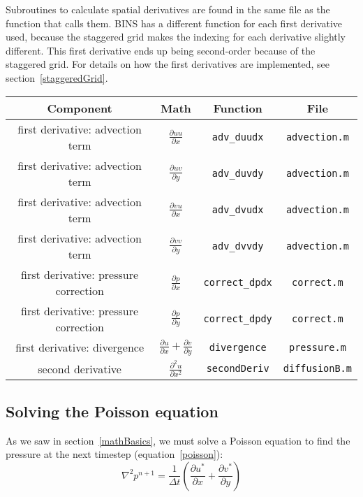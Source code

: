 \documentclass[12pt]{article}
\begin{document}
Subroutines to calculate spatial derivatives are found in the same file as the function that calls them.  BINS has a different function for each first derivative used, because the staggered grid makes the indexing for each derivative slightly different.  This first derivative ends up being second-order because of the staggered grid. For details on how the first derivatives are implemented, see section~\ref{staggeredGrid}.

\begin{center}
\begin{tabular}{|c|c|c|c|}
\hline 
\bf{Component} & \bf{Math} & \bf{Function} & \bf{File}\\ 
\hline 
first derivative: advection term & \Large{$\frac{\partial uu}{\partial x}$} & \texttt{adv\_duudx} & \texttt{advection.m}\\ 
\hline 
first derivative: advection term & \Large{$\frac{\partial uv}{\partial y}$} & \texttt{adv\_duvdy} & \texttt{advection.m}\\ 
\hline 
first derivative: advection term & \Large{$\frac{\partial vu}{\partial x}$} & \texttt{adv\_dvudx} & \texttt{advection.m}\\ 
\hline 
first derivative: advection term & \Large{$\frac{\partial vv}{\partial y}$} & \texttt{adv\_dvvdy} & \texttt{advection.m}\\ 
\hline 
first derivative: pressure correction & \Large{$\frac{\partial p}{\partial x}$} & \texttt{correct\_dpdx} & \texttt{correct.m}\\ 
\hline
first derivative: pressure correction & \Large{$\frac{\partial p}{\partial y}$} & \texttt{correct\_dpdy} & \texttt{correct.m}\\ 
\hline
first derivative: divergence & \Large{$\frac{\partial u}{\partial x} + \frac{\partial v}{\partial y}$} & \texttt{divergence} & \texttt{pressure.m}\\ 
\hline
second derivative & \Large{$\frac{\partial^2 u}{\partial x^2}$} & \texttt{secondDeriv} & \texttt{diffusionB.m}\\ 
\hline 
\end{tabular} 
\end{center}

\subsection{Solving the Poisson equation}
\label{poissonSolve}
\renewcommand\arraystretch{1}
As we saw in section~\ref{mathBasics}, we must solve a Poisson equation to find the pressure at the next timestep (equation~\ref{poisson}):
\[\nabla^2 p^{n+1} = \frac{1}{\Delta t}\left( \frac{\partial u^*}{\partial x} + \frac{\partial v^*}{\partial y}\right)\]
\end{document}
